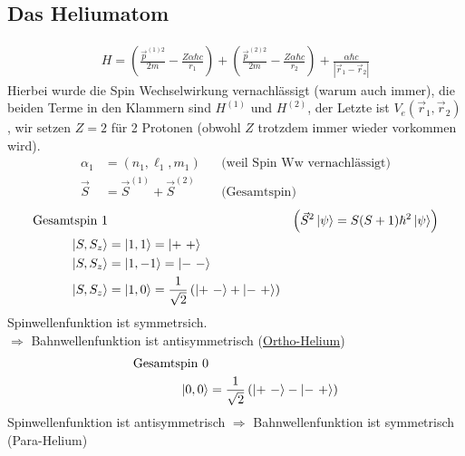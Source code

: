 \subsection{Das Heliumatom}
	\begin{align*}
		H = \left(\frac{\vec{p}^{(1)2}}{2m} - \frac{Z \alpha \hbar c}{r_1}\right)
		+ \left(\frac{\vec{p}^{(2)2}}{2m} - \frac{Z \alpha \hbar c}{r_2}\right)
		+ \frac{\alpha \hbar c}{|\vec{r}_1 - \vec{r}_2|}
	\end{align*}
Hierbei wurde die Spin Wechselwirkung vernachlässigt (warum auch immer), die beiden Terme in den Klammern sind $H^{(1)}$ und $H^{(2)}$, der Letzte ist $V_e(\vec{r}_1, \vec{r}_2)$, wir setzen $Z=2$ für 2 Protonen (obwohl $Z$ trotzdem immer wieder vorkommen wird).
	\begin{align*}
		\alpha_1 &= (n_1, \ell_1, m_1) & &\text{(weil Spin Ww vernachlässigt)} \\
		\vec{S} &= \vec{S}^{(1)} + \vec{S}^{(2)} & &\text{(Gesamtspin)}
	\end{align*}
	\begin{align*}
		\text{Gesamtspin }1& & \left(\vec{S}^2 \ket{\psi} = S(S+1) \hbar^2 \ket{\psi} \right) \\
		\ket{S, S_z} &= \ket{1 ,1} = \ket{+~+} \\
		\ket{S, S_z} &= \ket{1, -1} = \ket{-~-} \\
		\ket{S, S_z} &= \ket{1, 0} = \frac{1}{\sqrt{2}} \left( \ket{+~-} + \ket{-~+} \right)
	\end{align*}
Spinwellenfunktion ist symmetrsich. \\
$\Rightarrow$ Bahnwellenfunktion ist antisymmetrisch (\underline{Ortho-Helium})
	\begin{align*}
		\text{Gesamtspin }0& \\
		\ket{0 , 0} &= \frac{1}{\sqrt{2}} \left( \ket{+~-} - \ket{-~+} \right)
	\end{align*}
Spinwellenfunktion ist antisymmetrisch $\Rightarrow$ Bahnwellenfunktion ist symmetrisch (Para-Helium)

